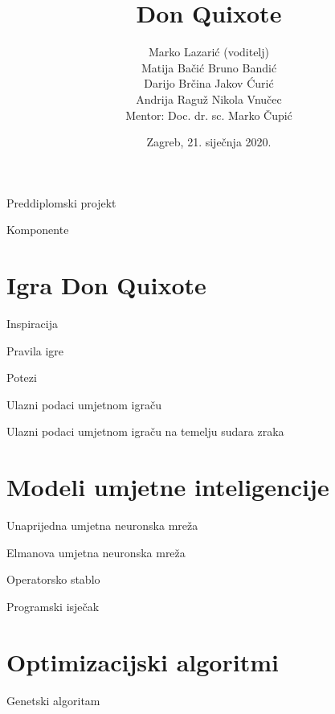 \documentclass{beamer}
\title{Don Quixote}
\date{\vspace{1em}Zagreb, 21. siječnja 2020.}
\institute{Fakultet elektrotehnike i računarstva}
\author{Marko Lazarić (voditelj)  \\ Matija Bačić \hspace*{10em} Bruno Bandić \\ Darijo Brčina \hspace*{9.75em} Jakov Ćurić \\ Andrija Raguž \hspace*{9.3em} Nikola Vnučec \\[1em] Mentor: Doc. dr. sc. Marko Čupić}
\begin{document}
  \begin{frame}
  	\centering
  	\vspace{2em}
  	Preddiplomski projekt
  	\vspace{-4em}
  	
  	\titlepage
  \end{frame}

  \begin{frame}{Komponente}
	\tableofcontents
  \end{frame}

  \section{Igra Don Quixote}
  \begin{frame}{Inspiracija}
  \end{frame}

  \begin{frame}{Pravila igre}
  \end{frame}

  \begin{frame}{Potezi}
  \end{frame}

  \begin{frame}{Ulazni podaci umjetnom igraču}
  \end{frame}

  \begin{frame}{Ulazni podaci umjetnom igraču na temelju sudara zraka}
  \end{frame}

  \section{Modeli umjetne inteligencije}
  \begin{frame}{Unaprijedna umjetna neuronska mreža}
  \end{frame}

  \begin{frame}{Elmanova umjetna neuronska mreža}
  \end{frame}

  \begin{frame}{Operatorsko stablo}
  \end{frame}

  \begin{frame}{Programski isječak}
  \end{frame}

  \section{Optimizacijski algoritmi}
  \begin{frame}{Genetski algoritam}
  \end{frame}
\end{document}
